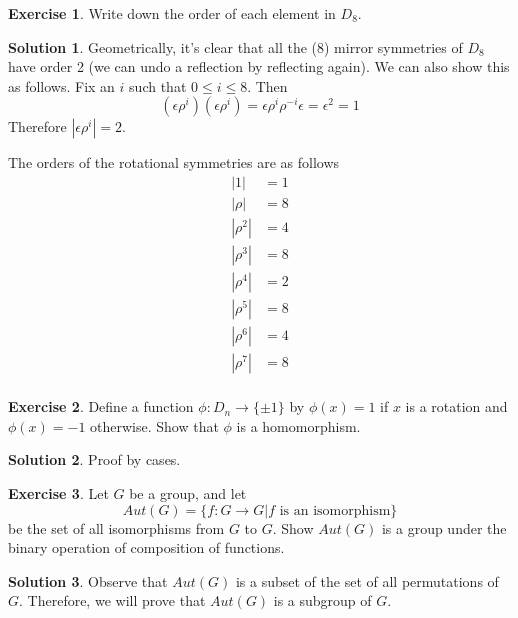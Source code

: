 \documentclass[12pt]{article}
\theoremstyle{definition}
\newcommand{\e}{\epsilon}
\newtheorem{exercise}{\color{YellowOrange}Exercise}
\theoremstyle{definition}
\newtheorem{solution}{\color{Goldenrod}Solution}
\begin{document}
\begin{exercise}
Write down the order of each element in $D_8$.
\end{exercise}
\begin{solution}
Geometrically, it's clear that all the ($8$) mirror symmetries of $D_8$ have order 2 (we can undo a reflection by reflecting again). We can also show this as follows. Fix an $i$ such that $0 \leq i \leq 8$. Then
\begin{equation}
	(\e \rho^i)(\e \rho^i) = \e \rho^i \rho^{-i} \e = \e^2 = 1	
\end{equation}
Therefore $|\e \rho^i| = 2$. 

The orders of the rotational symmetries are as follows
\begin{align*}
|1| &= 1 \\
|\rho| &= 8 \\
|\rho^2| &= 4 \\
|\rho^3| &= 8 \\
|\rho^4| &= 2 \\
|\rho^5| &= 8 \\
|\rho^6| &= 4 \\
|\rho^7| &= 8 \\
\end{align*}
\end{solution}

\begin{exercise}
Define a function $\phi : D_n \to \{\pm 1\}$ by $\phi(x) = 1$ if $x$ is a rotation and $\phi(x) = -1$ otherwise. Show that $\phi$ is a homomorphism.
\end{exercise}
\begin{solution}
Proof by cases. 
\end{solution}

\begin{exercise}
Let $G$ be a group, and let
\begin{equation}
	Aut(G) = \{f : G \to G | f \text{ is an isomorphism} \} 
\end{equation}
be the set of all isomorphisms from $G$ to $G$. Show $Aut(G)$ is a group under the binary operation of composition of functions. 
\end{exercise}

\begin{solution}
Observe that $Aut(G)$ is a subset of the set of all permutations of $G$. Therefore, we will prove that $Aut(G)$ is a subgroup of $G$. 
\end{solution}
\end{document}
